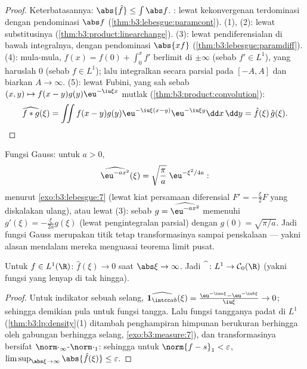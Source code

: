 \begin{proof}
Keterbatasannya: $\abs{\hat f} \leq \int\abs f$. : lewat kekonvergenan
terdominasi dengan pendominasi $\abs f$ (\cref{thm:b3:lebesgue:paramcont}).
(1), (2): lewat substitusinya
(\cref{thm:b3:product:linearchange}). (3): lewat pendiferensialan
di bawah integralnya, dengan pendominasi $\abs{xf}$
(\cref{thm:b3:lebesgue:paramdiff}). (4): mula-mula, $f(x) = f(0)
+ \int_0^xf'$ berlimit di $\pm\infty$ (sebab $f' \in L^1$), yang
haruslah $0$ (sebab $f \in L^1$); lalu integralkan secara parsial pada $[-A,
A]$ dan biarkan $A \to \infty$. (5): lewat Fubini, yang sah sebab
$(x,y)\mapsto f(x - y)g(y)\eu^{-\iu\xi x}$ 
mutlak (\cref{thm:b3:product:convolution}):
\[
\widehat{f*g}(\xi) = \iint f(x - y)g(y)\eu^{-\iu\xi(x - y)}
\eu^{-\iu\xi y}\dd x\,\dd y = \hat f(\xi)\,\hat g(\xi).
\]
\end{proof}

\begin{example}\label{ex:b3:fouriertransform:gaussian}
Fungsi Gauss: untuk $a > 0$,
\[
\widehat{\eu^{-ax^2}}(\xi) =
\sqrt{\frac\pi a}\;\eu^{-\xi^2/4a} :
\]
menurut \cref{exo:b3:lebesgue:7} (lewat kiat persamaan diferensial $F' = -\frac\xi{2}F$
yang diskalakan ulang), atau lewat (3): sebab $g = \widehat{\eu^{-ax^2}}$
memenuhi $g'(\xi) = -\frac{\xi}{2a}g(\xi)$ (lewat pengintegralan
parsial) dengan $g(0) = \sqrt{\pi/a}$. Jadi fungsi Gauss merupakan titik tetap
transformasinya sampai penskalaan --- yakni alasan mendalam mereka menguasai
teorema limit pusat.
\end{example}

\begin{theorem}
\label{thm:b3:fouriertransform:riemannlebesgue}
Untuk $f \in L^1(\R)$: $\hat f(\xi) \to 0$ saat $\abs\xi \to
\infty$. Jadi $\widehat{\phantom f} \colon L^1 \to \mathcal
C_0(\R)$ (yakni fungsi  yang lenyap di
tak hingga).
\end{theorem}

\begin{proof}
Untuk indikator sebuah selang, $\widehat{\mathbf 1_{\intcc
ab}}(\xi) = \frac{\eu^{-\iu a\xi} - \eu^{-\iu b\xi}}{\iu\xi}
\to 0$; sehingga demikian pula untuk fungsi tangga. Lalu fungsi tangganya padat di
$L^1$ (\cref{thm:b3:lp:density}(1) ditambah penghampiran
himpunan berukuran berhingga oleh gabungan berhingga selang,
\cref{exo:b3:measure:7}), dan transformasinya bersifat
 $\norm\cdot_\infty$-$\norm\cdot_1$: sehingga untuk $\norm{f -
s}_1 < \varepsilon$, $\limsup_{\abs\xi\to\infty}\abs{\hat
f(\xi)} \leq \varepsilon$.
\end{proof}

